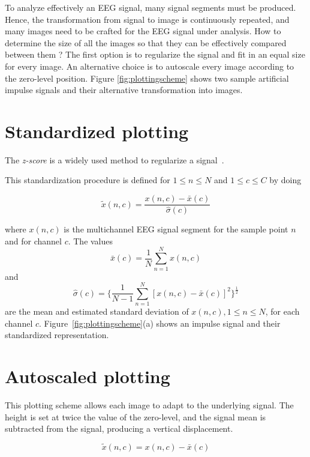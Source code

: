 To analyze effectively an EEG signal, many signal segments must be produced.  Hence, the transformation from signal to image is continuously repeated, and many images need to be crafted for the EEG signal under analysis.  How to determine the size of all the images so that they can be effectively compared between them ?  The first option is to regularize the signal and fit in an equal size for every image.  An alternative choice is to autoscale every image according to the zero-level position.  Figure \ref{fig:plottingscheme} shows two sample artificial impulse signals and their  alternative transformation into images.

\section{Standardized plotting}
\label{standardized}

The \textit{z-score} is a widely used method to regularize a signal~\cite{Zhang2013}.

This standardization procedure is defined for  $1 \leq n \leq N$ and $1 \leq c \leq C$ by doing

\begin{equation}
\tilde{x}(n,c) =  \frac{ x(n,c) - \bar{x}(c) }{ \hat{\sigma}(c) } 
\label{eq:standarizedaverages}
\end{equation}

\noindent  where $ x(n,c) $ is the multichannel EEG signal segment for the sample point $n$ and for channel $c$. The values $$\bar{x}(c) =\frac{1}{N}\sum_{n=1}^{N}x(n,c)$$ and $$ \hat{\sigma}(c) =   \bigg \{ \frac{1}{N-1}\sum_{n=1}^{N} { \left[ x(n,c)-\bar{x}(c) \right]  }^2 \bigg \}^{\frac{1}{2}}$$ are the mean and estimated standard deviation of $x(n,c), 1 \leq n \leq N$, for each channel $c$. Figure~\ref{fig:plottingscheme}(a) shows an impulse signal and their standardized representation.

\section{Autoscaled plotting}
\label{autoscaled}

This plotting scheme allows each image to adapt to the underlying signal.  The height is set at twice the value of the zero-level, and the signal mean is subtracted from the signal, producing a vertical displacement.

\begin{equation}
\tilde{x}(n,c) =  x(n,c) - \bar{x}(c) 
\label{eq:autoscaled}
\end{equation}

